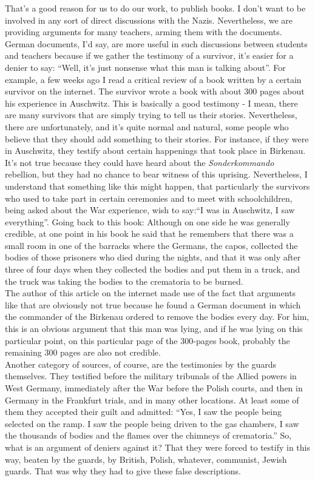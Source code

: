 That's a good reason for us to do our work, to publish books. I don’t want to be involved in any sort of direct discussions with the Nazis. Nevertheless, we are providing arguments for many teachers, arming them with the documents. German documents, I'd say, are more useful in such discussions between students and teachers because if we gather the testimony of a survivor, it’s easier for a denier to say: ``Well, it’s just nonsense what this man is talking about''. For example, a few weeks ago I read a critical review of a book written by a certain survivor on the internet. The survivor wrote a book with about 300 pages about his experience in Auschwitz. This is basically a good testimony - I mean, there are many survivors that are simply trying to tell us their stories. Nevertheless, there are unfortunately, and it's quite normal and natural, some people who believe that they should add something to their stories. For instance, if they were in Auschwitz, they testify about certain happenings that took place in Birkenau. It’s not true because they could have heard about the \textit{Sonderkommando} rebellion, but they had no chance to bear witness of this uprising. Nevertheless, I understand that something like this might happen, that particularly the survivors who used to take part in certain ceremonies and to meet with schoolchildren, being asked about the War experience, wish to say:``I was in Auschwitz, I saw everything''. Going back to this book: Although on one side he was generally credible, at one point in his book he said that he remembers that there was a small room in one of the barracks where the Germans, the capos, collected the bodies of those prisoners who died during the nights, and that it was only after three of four days when they collected the bodies and put them in a truck, and the truck was taking the bodies to the crematoria to be burned.\\
The author of this article on the internet made use of the fact that arguments like that are obviously not true because he found a German document in which the commander of the Birkenau ordered to remove the bodies every day. For him, this is an obvious argument that this man was lying, and if he was lying on this particular point, on this particular page of the 300-pages book, probably the remaining 300 pages are also not credible.\\
Another category of sources, of course, are the testimonies by the guards themselves. They testified before the military tribunals of the Allied powers in West Germany, immediately after the War before the Polish courts, and then in Germany in the Frankfurt trials, and in many other locations. At least some of them they accepted their guilt and admitted: ``Yes, I saw the people being selected on the ramp. I saw the people being driven to the gas chambers, I saw the thousands of bodies and the flames over the chimneys of crematoria.'' So, what is an argument of deniers against it? That they were forced to testify in this way, beaten by the guards, by British, Polish, whatever, communist, Jewish guards. That was why they had to give these false descriptions. \\
